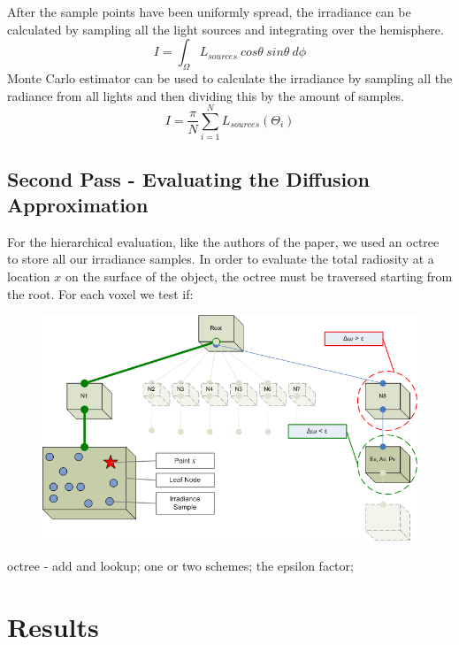 \documentclass{article}
\begin{document}
After the sample points have been uniformly spread, the irradiance can be calculated by sampling all the light sources and integrating over the hemisphere.
\begin{equation}
I = \int_{ \Omega  }^{ } L_{sources} \: cos\theta \: sin\theta \:d\phi 
\end{equation}
Monte Carlo estimator can be used to calculate the irradiance by sampling all the radiance from all lights and then dividing this by the amount of samples.
\begin{equation}
I =  \frac{ \pi }{N } \sum_{i=1}^{ N}L_{sources} \left (  \Theta_i  \right )
\end{equation}

\subsection{Second Pass - Evaluating the Diffusion Approximation}

For the hierarchical evaluation, like the authors of the paper, we used an octree to store all our irradiance samples. In order to evaluate the total radiosity at a location $x$ on the surface of the object, the octree must be traversed starting from the root. For each voxel we test if:


\begin{figure}[tbh]
\centering
\includegraphics[scale=0.5]{./Pictures/Octree.png}
\caption{}
\label{Hierarchical Evaluation}
\end{figure}

octree - add and lookup; one or two schemes; the epsilon factor;

\section{Results}
\end{document}
